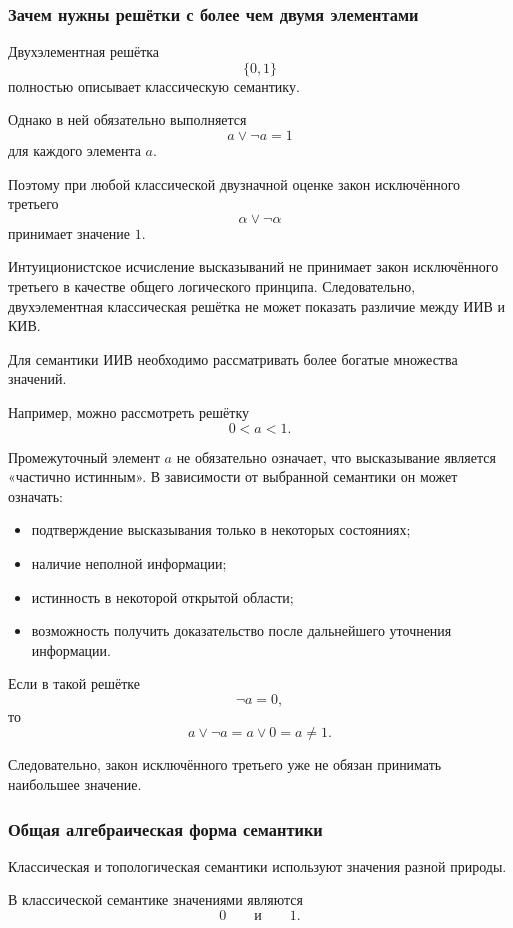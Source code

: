 \documentclass[12pt,a4paper,oneside,openany]{book}
\theoremstyle{definition}
\theoremstyle{plain}
\theoremstyle{remark}
\begin{document}
\subsubsection{Зачем нужны решётки с более чем двумя элементами}

Двухэлементная решётка
\[
\{0,1\}
\]
полностью описывает классическую семантику.

Однако в ней обязательно выполняется
\[
a\vee\neg a=1
\]
для каждого элемента \(a\).

Поэтому при любой классической двузначной оценке закон исключённого
третьего
\[
\alpha\lor\neg\alpha
\]
принимает значение \(1\).

Интуиционистское исчисление высказываний не принимает закон
исключённого третьего в качестве общего логического принципа.
Следовательно, двухэлементная классическая решётка не может показать
различие между ИИВ и КИВ.

Для семантики ИИВ необходимо рассматривать более богатые множества
значений.

Например, можно рассмотреть решётку
\[
0<a<1.
\]

Промежуточный элемент \(a\) не обязательно означает, что высказывание
является «частично истинным». В зависимости от выбранной семантики он
может означать:

\begin{itemize}
    \item подтверждение высказывания только в некоторых состояниях;
    \item наличие неполной информации;
    \item истинность в некоторой открытой области;
    \item возможность получить доказательство после дальнейшего
          уточнения информации.
\end{itemize}

Если в такой решётке
\[
\neg a=0,
\]
то
\[
a\vee\neg a
=
a\vee0
=
a
\neq1.
\]

Следовательно, закон исключённого третьего уже не обязан принимать
наибольшее значение.


\subsubsection{Общая алгебраическая форма семантики}

Классическая и топологическая семантики используют значения разной
природы.

В классической семантике значениями являются
\[
0
\qquad\text{и}\qquad
1.
\]
\end{document}
